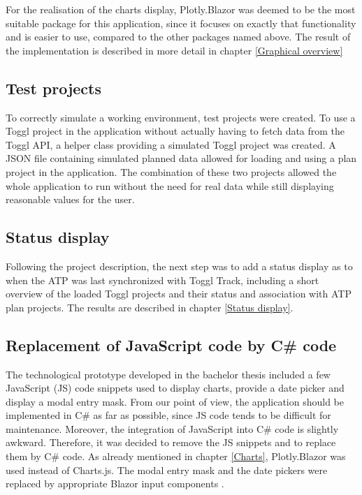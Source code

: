 For the realisation of the charts display, Plotly.Blazor was deemed to be the most suitable package for this application, since it focuses on exactly that functionality and is easier to use, compared to the other packages named above. The result of the implementation is described in more detail in chapter \ref{Graphical overview}

\subsection{Test projects}
To correctly simulate a working environment, test projects were created. To use a Toggl project in the application without actually having to fetch data from the Toggl API, a helper class providing a simulated Toggl project was created. A JSON file containing simulated planned data allowed for loading and using a plan project in the application. The combination of these two projects allowed the whole application to run without the need for real data while still displaying reasonable values for the user.

\subsection{Status display}
Following the project description, the next step was to add a status display as to when the ATP was last synchronized with Toggl Track, including a short overview of the loaded Toggl projects and their status and association with ATP plan projects. The results are described in chapter \ref{Status display}.

\subsection{Replacement of JavaScript code by C\# code} \label{JS replacement}
The technological prototype developed in the bachelor thesis included a few JavaScript (JS) code snippets used to display charts, provide a date picker and display a modal entry mask. From our point of view, the application should be implemented in C\# as far as possible, since JS code tends to be difficult for maintenance. Moreover, the integration of JavaScript into C\# code is slightly awkward. Therefore, it was decided to remove the JS snippets and to replace them by C\# code. As already mentioned in chapter \ref{Charts}, Plotly.Blazor was used instead of Charts.js. The modal entry mask and the date pickers were replaced by appropriate Blazor input components \cite{blazor-input-url}.

